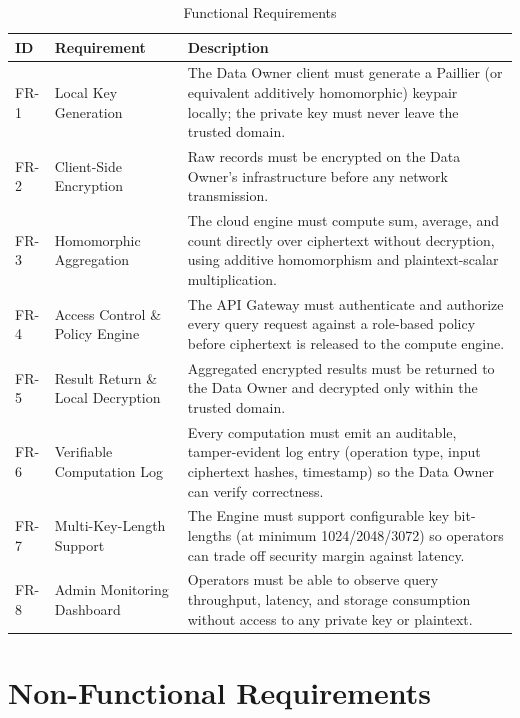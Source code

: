 \documentclass[12pt]{article}
\begin{document}
\begin{table}[H]
\centering
\begin{tabularx}{\textwidth}{l l X}
\toprule
\textbf{ID} & \textbf{Requirement} & \textbf{Description} \\
\midrule
FR-1 & Local Key Generation & The Data Owner client must generate a Paillier (or equivalent additively homomorphic) keypair locally; the private key must never leave the trusted domain. \\
FR-2 & Client-Side Encryption & Raw records must be encrypted on the Data Owner's infrastructure before any network transmission. \\
FR-3 & Homomorphic Aggregation & The cloud engine must compute sum, average, and count directly over ciphertext without decryption, using additive homomorphism and plaintext-scalar multiplication. \\
FR-4 & Access Control \& Policy Engine & The API Gateway must authenticate and authorize every query request against a role-based policy before ciphertext is released to the compute engine. \\
FR-5 & Result Return \& Local Decryption & Aggregated encrypted results must be returned to the Data Owner and decrypted only within the trusted domain. \\
FR-6 & Verifiable Computation Log & Every computation must emit an auditable, tamper-evident log entry (operation type, input ciphertext hashes, timestamp) so the Data Owner can verify correctness. \\
FR-7 & Multi-Key-Length Support & The Engine must support configurable key bit-lengths (at minimum 1024/2048/3072) so operators can trade off security margin against latency. \\
FR-8 & Admin Monitoring Dashboard & Operators must be able to observe query throughput, latency, and storage consumption without access to any private key or plaintext. \\
\bottomrule
\end{tabularx}
\caption{Functional Requirements}
\label{tab:functional_reqs}
\end{table}

\section{Non-Functional Requirements}
\end{document}
